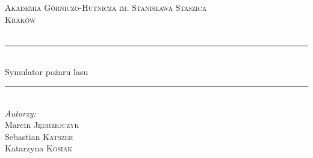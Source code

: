\documentclass[a4paper, 11pt]{article}
\begin{document}
	
	\begin{titlepage}
	
	
		
		\newcommand{\HRule}{\rule{\linewidth}{0.5mm}} %
		
		\center %
		
		
		\textsc{\LARGE Akademia Górniczo-Hutnicza im. Stanisława Staszica}\\[1.5cm] %
		\textsc{\Large Kraków}\\[0.5cm] %
		\textsc{\large }\\[0.5cm] %
		
		
		\HRule \\[0.4cm]
		{\fontsize{38}{50}\selectfont Symulator pożaru lasu}
		\HRule \\[1.5cm]
		
		
		\Large \emph{Autorzy:}\\
		Marcin \textsc{Jędrzejczyk}\\ %
		Sebastian \textsc{Katszer}\\ %
		Katarzyna \textsc{Kosiak} \\[3cm]\ %


\end{titlepage}
\end{document}
